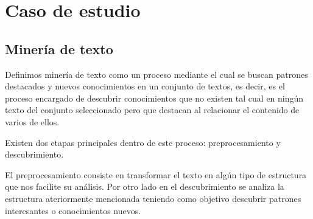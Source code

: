 

\section{Caso de estudio}

\subsection{Minería de texto}

Definimos minería de texto como  un proceso mediante el cual se buscan patrones destacados y nuevos conocimientos en un conjunto de textos, es decir, es el proceso encargado de descubrir conocimientos que no existen tal cual en ningún texto del conjunto seleccionado pero que destacan al relacionar el contenido de varios de ellos.

Existen dos etapas principales dentro de este proceso: preprocesamiento y descubrimiento. 

El preprocesamiento consiste en transformar el texto en algún tipo de estructura que nos facilite su análisis. Por otro lado en el descubrimiento se analiza la estructura ateriormente mencionada teniendo como objetivo descubrir patrones interesantes o conocimientos nuevos.


